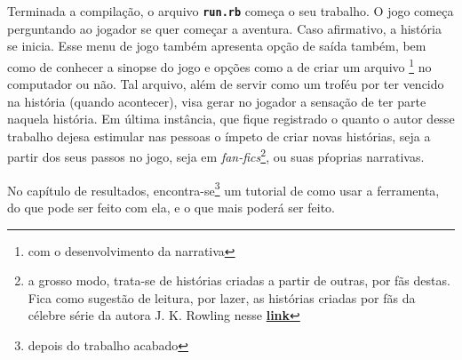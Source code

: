 Terminada a compilação, o arquivo \texttt{\textbf{run.rb}} começa o seu trabalho.
O jogo começa perguntando ao jogador se quer começar a aventura. Caso afirmativo,
a história se inicia. Esse menu de jogo também apresenta opção de saída também,
bem como de conhecer a sinopse do jogo e opções como a de criar um arquivo
\footnote{com o desenvolvimento da narrativa} no computador ou não. Tal arquivo,
além de servir como um troféu por ter vencido na história (quando acontecer),
visa gerar no jogador a sensação de ter parte naquela história. Em última
instância, que fique registrado o quanto o autor desse trabalho dejesa estimular
nas pessoas o ímpeto de criar novas histórias, seja a partir dos seus passos no
jogo, seja em \emph{fan-fics}\footnote{a grosso modo, trata-se de histórias
criadas a partir de outras, por fãs  destas. Fica como sugestão de leitura,
por lazer, as histórias criadas por fãs da célebre série da autora J. K. Rowling
nesse
\href{https://super.abril.com.br/blog/turma-do-fundao/5-fanfics-para-matar-a-saudade-de-harry-potter/}{\textbf{link}}},
ou suas pŕoprias narrativas.

No capítulo de resultados, encontra-se\footnote{depois do trabalho acabado} um
tutorial de como usar a ferramenta, do que pode ser feito com ela, e o que mais
poderá ser feito.
